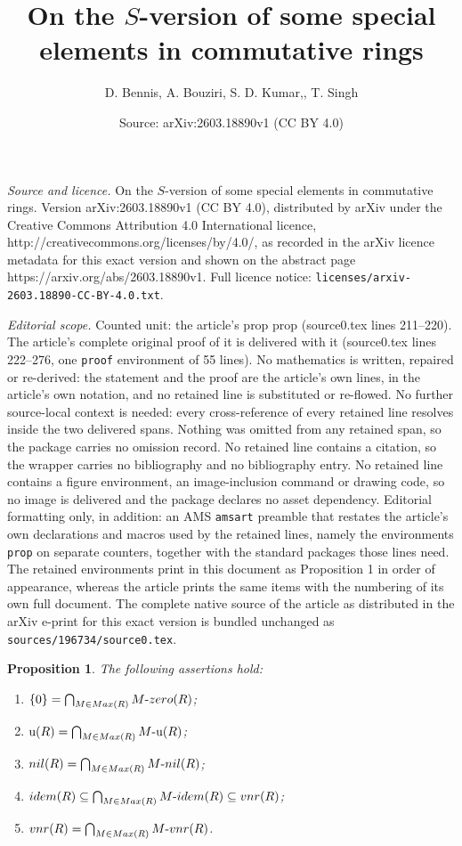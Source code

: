\documentclass[10pt,a4paper]{amsart}
\title{On the $S$-version of some special elements in commutative rings}
\author{D. Bennis, A. Bouziri, S. D. Kumar,, T. Singh}
\date{Source: arXiv:2603.18890v1 (CC BY 4.0)}
\newtheorem{prop}{Proposition}
\def\Max{{\rm Max}}
\def\idem{{\rm idem}}
\def\nil{{\rm nil}}
\def\u{\mathrm{u}}
\def\vnr{{\rm vnr}}
\def\z{{zero}}
\begin{document}
\maketitle

\noindent\emph{Source and licence.} On the $S$-version of some special elements in commutative rings. Version arXiv:2603.18890v1 (CC BY 4.0), distributed by arXiv under the Creative Commons Attribution 4.0 International licence, http://creativecommons.org/licenses/by/4.0/, as recorded in the arXiv licence metadata for this exact version and shown on the abstract page https://arxiv.org/abs/2603.18890v1. Full licence notice: \texttt{licenses/arxiv-2603.18890-CC-BY-4.0.txt}.\par\smallskip

\noindent\textit{Editorial scope.} Counted unit: the article's prop prop (source0.tex lines 211--220). The article's complete original proof of it is delivered with it (source0.tex lines 222--276, one \texttt{proof} environment of 55 lines). No mathematics is written, repaired or re-derived: the statement and the proof are the article's own lines, in the article's own notation, and no retained line is substituted or re-flowed.  No further source-local context is needed: every cross-reference of every retained line resolves inside the two delivered spans.  Nothing was omitted from any retained span, so the package carries no omission record.  No retained line contains a citation, so the wrapper carries no bibliography and no bibliography entry.  No retained line contains a figure environment, an image-inclusion command or drawing code, so no image is delivered and the package declares no asset dependency.  Editorial formatting only, in addition: an AMS \texttt{amsart} preamble that restates the article's own declarations and macros used by the retained lines, namely the environments \texttt{prop} on separate counters, together with the standard packages those lines need.  The retained environments print in this document as Proposition 1 in order of appearance, whereas the article prints the same items with the numbering of its own full document.  The complete native source of the article as distributed in the arXiv e-print for this exact version is bundled unchanged as \texttt{sources/196734/source0.tex}.
\begin{prop}
The following assertions hold:
\begin{enumerate}
    \item \( \{0\} = \bigcap_{M \in \Max(R)} M\text{-}\z(R) \);
    \item \( \u(R) = \bigcap_{M \in \Max(R)} M\text{-}\u(R) \);
    \item \( \nil(R) = \bigcap_{M \in \Max(R)} M\text{-}\nil(R) \);
    \item \( \idem(R) \subseteq \bigcap_{M \in \Max(R)} M\text{-}\idem(R) \subseteq \vnr(R) \);
    \item \( \vnr(R) = \bigcap_{M \in \Max(R)} M\text{-}\vnr(R) \).
\end{enumerate}
\end{prop}
\end{document}
